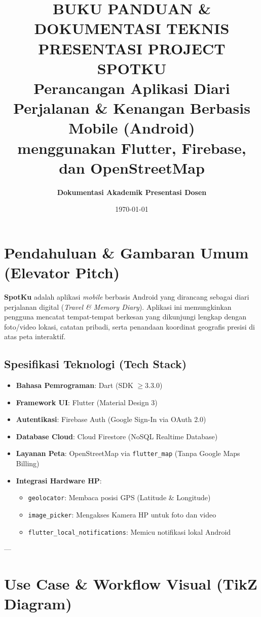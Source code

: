\documentclass[12pt,a4paper]{article}
\title{
    \textbf{\Large BUKU PANDUAN \& DOKUMENTASI TEKNIS PRESENTASI PROJECT SPOTKU}\\[0.5em]
    \large Perancangan Aplikasi Diari Perjalanan \& Kenangan Berbasis Mobile (Android)\\
    menggunakan Flutter, Firebase, dan OpenStreetMap
}
\author{\textbf{Dokumentasi Akademik Presentasi Dosen}}
\date{\today}
\begin{document}
\maketitle
\tableofcontents
\newpage

\section{Pendahuluan \& Gambaran Umum (Elevator Pitch)}

\textbf{SpotKu} adalah aplikasi \textit{mobile} berbasis Android yang dirancang sebagai diari perjalanan digital (\textit{Travel \& Memory Diary}). Aplikasi ini memungkinkan pengguna mencatat tempat-tempat berkesan yang dikunjungi lengkap dengan foto/video lokasi, catatan pribadi, serta penandaan koordinat geografis presisi di atas peta interaktif.

\subsection{Spesifikasi Teknologi (Tech Stack)}
\begin{itemize}[leftmargin=*]
    \item \textbf{Bahasa Pemrograman}: Dart (SDK $\ge 3.3.0$)
    \item \textbf{Framework UI}: Flutter (Material Design 3)
    \item \textbf{Autentikasi}: Firebase Auth (Google Sign-In via OAuth 2.0)
    \item \textbf{Database Cloud}: Cloud Firestore (NoSQL Realtime Database)
    \item \textbf{Layanan Peta}: OpenStreetMap via \texttt{flutter\_map} (Tanpa Google Maps Billing)
    \item \textbf{Integrasi Hardware HP}: 
    \begin{itemize}
        \item \texttt{geolocator}: Membaca posisi GPS (Latitude \& Longitude)
        \item \texttt{image\_picker}: Mengakses Kamera HP untuk foto dan video
        \item \texttt{flutter\_local\_notifications}: Memicu notifikasi lokal Android
    \end{itemize}
\end{itemize}

---

\section{Use Case \& Workflow Visual (TikZ Diagram)}
\end{document}
